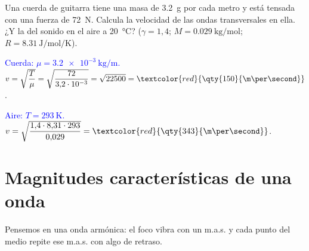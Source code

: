 \begin{exercise}
    Una cuerda de guitarra tiene una masa de \qty{3.2}{\g} por cada metro y está tensada con una fuerza de \qty{72}{\newton}.
    Calcula la velocidad de las ondas transversales en ella. ¿Y la del sonido en el aire a \qty{20}{\celsius}?
    (\(\gamma = 1{,}4\); \(M = \qty{0.029}{\kg\per\mol}\); \(R = \qty{8.31}{\joule\per\mol\per\kelvin}\)).
    \begin{solu}
        \textcolor{blue}{Cuerda: \(\mu = \qty{3.2e-3}{\kg\per\m}\).}
        \(v = \sqrt{\dfrac{T}{\mu}} = \sqrt{\dfrac{72}{3{,}2\cdot 10^{-3}}} = \sqrt{22500} = \textcolor{red}{\qty{150}{\m\per\second}}\).

        \textcolor{blue}{Aire: \(T = \qty{293}{\kelvin}\).}
        \(v = \sqrt{\dfrac{1{,}4\cdot 8{,}31\cdot 293}{0{,}029}} = \textcolor{red}{\qty{343}{\m\per\second}}\).
    \end{solu}
\end{exercise}

\section{Magnitudes características de una onda}\label{sec:ond-magnitudes}

Pensemos en una onda armónica: el foco vibra con un m.a.s. y cada punto del medio repite ese m.a.s. con algo de retraso.

